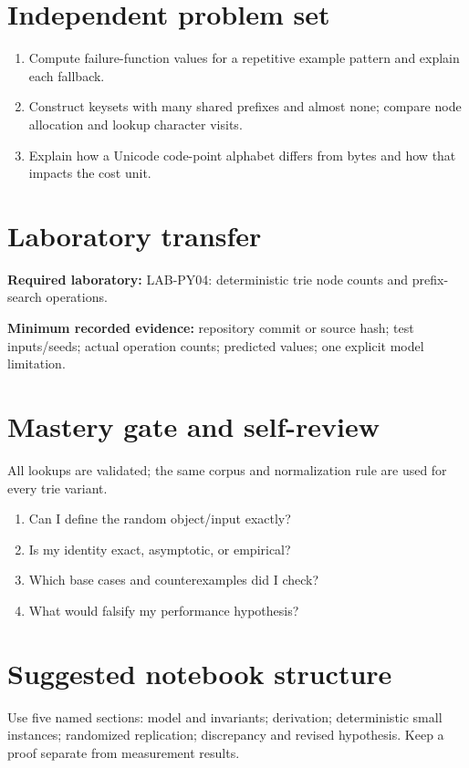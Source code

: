 \documentclass[11pt]{article}
\begin{document}
\section{Independent problem set}
\begin{enumerate}
\item Compute failure-function values for a repetitive example pattern and explain each fallback.
\item Construct keysets with many shared prefixes and almost none; compare node allocation and lookup character visits.
\item Explain how a Unicode code-point alphabet differs from bytes and how that impacts the cost unit.
\end{enumerate}
\section{Laboratory transfer}
\textbf{Required laboratory:} LAB-PY04: deterministic trie node counts and prefix-search operations.\par
\noindent\textbf{Minimum recorded evidence:} repository commit or source hash; test inputs/seeds; actual operation counts; predicted values; one explicit model limitation.\par
\section{Mastery gate and self-review}
All lookups are validated; the same corpus and normalization rule are used for every trie variant.\par
\begin{enumerate}\item Can I define the random object/input exactly? \item Is my identity exact, asymptotic, or empirical? \item Which base cases and counterexamples did I check? \item What would falsify my performance hypothesis?\end{enumerate}
\section{Suggested notebook structure}
Use five named sections: model and invariants; derivation; deterministic small instances; randomized replication; discrepancy and revised hypothesis. Keep a proof separate from measurement results.
\end{document}
